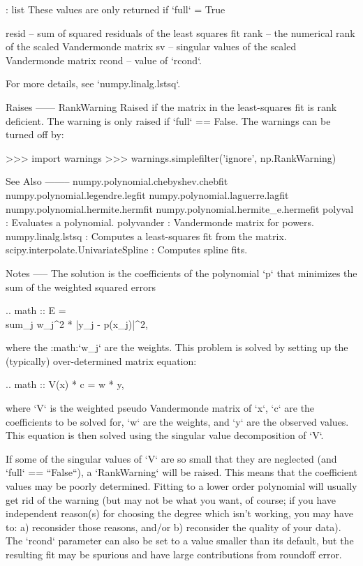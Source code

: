 \begin{DoxyVerb}
 : list
    These values are only returned if `full` = True

    resid -- sum of squared residuals of the least squares fit
    rank -- the numerical rank of the scaled Vandermonde matrix
    sv -- singular values of the scaled Vandermonde matrix
    rcond -- value of `rcond`.

    For more details, see `numpy.linalg.lstsq`.

Raises
------
RankWarning
    Raised if the matrix in the least-squares fit is rank deficient.
    The warning is only raised if `full` == False.  The warnings can
    be turned off by:

    >>> import warnings
    >>> warnings.simplefilter('ignore', np.RankWarning)

See Also
--------
numpy.polynomial.chebyshev.chebfit
numpy.polynomial.legendre.legfit
numpy.polynomial.laguerre.lagfit
numpy.polynomial.hermite.hermfit
numpy.polynomial.hermite_e.hermefit
polyval : Evaluates a polynomial.
polyvander : Vandermonde matrix for powers.
numpy.linalg.lstsq : Computes a least-squares fit from the matrix.
scipy.interpolate.UnivariateSpline : Computes spline fits.

Notes
-----
The solution is the coefficients of the polynomial `p` that minimizes
the sum of the weighted squared errors

.. math :: E = \\sum_j w_j^2 * |y_j - p(x_j)|^2,

where the :math:`w_j` are the weights. This problem is solved by
setting up the (typically) over-determined matrix equation:

.. math :: V(x) * c = w * y,

where `V` is the weighted pseudo Vandermonde matrix of `x`, `c` are the
coefficients to be solved for, `w` are the weights, and `y` are the
observed values.  This equation is then solved using the singular value
decomposition of `V`.

If some of the singular values of `V` are so small that they are
neglected (and `full` == ``False``), a `RankWarning` will be raised.
This means that the coefficient values may be poorly determined.
Fitting to a lower order polynomial will usually get rid of the warning
(but may not be what you want, of course; if you have independent
reason(s) for choosing the degree which isn't working, you may have to:
a) reconsider those reasons, and/or b) reconsider the quality of your
data).  The `rcond` parameter can also be set to a value smaller than
its default, but the resulting fit may be spurious and have large
contributions from roundoff error.


\end{DoxyVerb}
